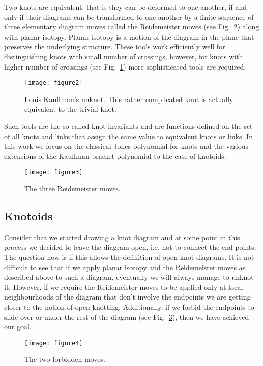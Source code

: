 Two knots are equivalent, that is they can be deformed to one another, if and only if their diagrams can be transformed to one another by a finite sequence of three elementary diagram moves called the Reidemeister moves (see Fig.~\ref{fig:rmoves}) along with planar isotopy. Planar isotopy is a motion of the diagram in the plane that preserves the underlying structure. These tools work efficiently well for distinguishing knots with small number of crossings, however, for knots with higher number of crossings (see Fig.~\ref{fig:unknot}) more sophisticated tools are required.
\begin{figure}[h]
\centering
\texttt{[image: figure2]}
\caption{Louis Kauffman's unknot. This rather complicated knot is actually equivalent to the trivial knot.}\label{fig:unknot}
\end{figure}

 Such tools are the so-called knot invariants and are functions defined on the set of all knots and links that assign the same value to equivalent knots or links. In this work we focus on the classical Jones polynomial for knots \cite{jones} and the various extensions of the Kauffman bracket polynomial \cite{kauffman1988} to the case of knotoids\cite{turaev,guka,gound2,goundaroulis2019}.

\begin{figure}[h]
\centering
\texttt{[image: figure3]}
\caption{The three Reidemeister moves.}\label{fig:rmoves}
\end{figure}


\subsection{\label{sec:theory:knotoids}Knotoids}
Consider that we started drawing a knot diagram and at some point in this process we decided to leave the diagram open, i.e. not to connect the end points. The question now is if this allows the definition of open knot diagrams. It is not difficult to see that if we apply planar isotopy and the Reidemeister moves as described above to such a diagram, eventually we will always manage to unknot it. However, if we require the Reidemeister moves to be applied only at local neighbourhoods of the diagram that don't involve the endpoints we are getting closer to the notion of open knotting. Additionally, if we forbid the endpoints to slide over or under the rest of the diagram (see Fig.~\ref{fig:forbidden}), then we have achieved our goal. 

\begin{figure}[h]
\centering
\texttt{[image: figure4]}
\caption{The two forbidden moves.}\label{fig:forbidden}
\end{figure}

